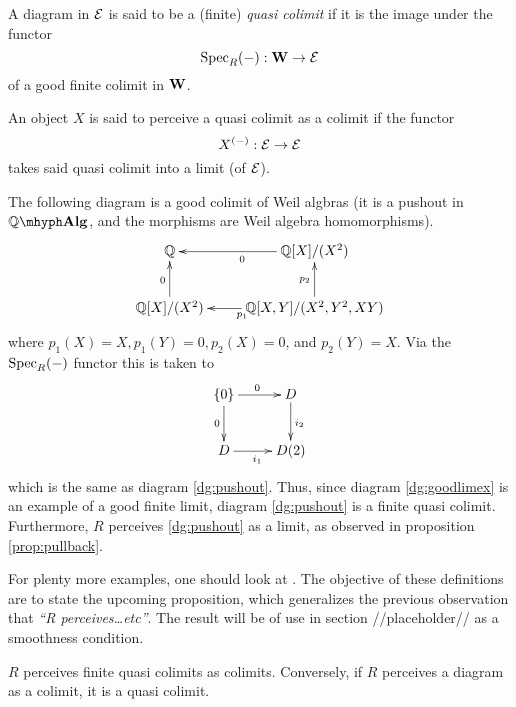 \begin{defn}
  A diagram in \( \mathcal{E} \) is said to be a (finite) \emph{quasi colimit} if it is the image under the functor
  \begin{equation*}
    \operatorname{Spec}_R(-):\mathbf W\to\mathcal{E}
  \end{equation*}
  of a good finite colimit in \( \mathbf W \).
\end{defn}

\begin{defn}
  An object \( X \) is said to perceive a quasi colimit as a colimit if the functor
  \begin{equation*}
    X^{(-)}:\mathcal{E}\to\mathcal{E}
  \end{equation*}
  takes said quasi colimit into a limit (of \( \mathcal{E} \)).
\end{defn}

\begin{exmp}
  The following diagram is a good colimit of Weil algbras (it is a pushout in \( \qalg \), and the morphisms are Weil algebra homomorphisms).
  \begin{equation}
    \xymatrix{
      {\Q}                   & {\Q[X]/(X^2)} \ar[l]^0 \\
      {\Q[X]/(X^2)} \ar[u]^0 & {\Q[X,Y]/(X^2,Y^2,XY)} \ar[u]^{p_2} \ar[l]^{p_1}
    }
    \label{dg:goodlimex}
  \end{equation}
  where \( p_1(X)=X, p_1(Y)=0, p_2(X)=0 \), and \( p_2(Y)=X \). Via the \( \operatorname{Spec}_R(-) \) functor this is taken to
  \begin{equation*}
    \xymatrix{
      {\{0\}} \ar[d]_0 \ar[r]^0 & D \ar[d]^{i_2} \\
      D \ar[r]_{i_1}            & D(2)
    } 
  \end{equation*}
  which is the same as diagram \ref{dg:pushout}. Thus, since diagram \ref{dg:goodlimex} is an example of a good finite limit, diagram \ref{dg:pushout} is a finite quasi colimit. Furthermore, \( R \) perceives \ref{dg:pushout} as a limit, as observed in proposition \ref{prop:pullback}.
\end{exmp}

For plenty more examples, one should look at \cite{lav96}. The objective of these definitions are to state the upcoming proposition, which generalizes the previous observation that \emph{``R perceives\dots etc''}. The result will be of use in section {//placeholder//} as a smoothness condition.

\begin{proposition}
  \( R \) perceives finite quasi colimits as colimits. Conversely, if \( R \) perceives a diagram as a colimit, it is a quasi colimit. 
  \label{prop:Rperc}
\end{proposition}

